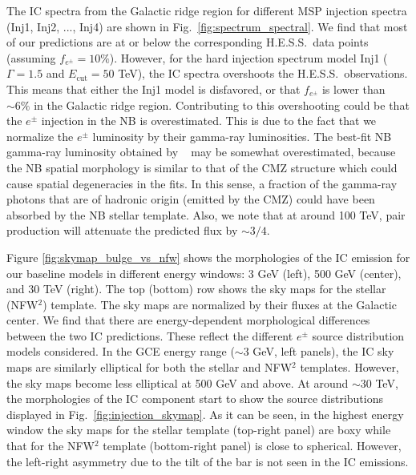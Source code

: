 \documentclass[doublespace,nopageskip]{VTthesis} %
\begin{document}
The IC spectra from the Galactic ridge region for different MSP injection spectra (Inj1, Inj2, ..., Inj4) are shown in Fig.~\ref{fig:spectrum_spectral}. We find that most of our predictions are at or below the corresponding H.E.S.S.~data points (assuming $f_{e^\pm} = 10\%$). However, for the hard injection spectrum model Inj1 ($\Gamma = 1.5$ and $E_{\text{cut}}=50$ TeV), the IC spectra overshoots the H.E.S.S.~observations. This means that either the Inj1 model is disfavored, or that $f_{e^\pm}$ is lower than $\sim 6\%$ in the Galactic ridge region. Contributing to this overshooting could be that the $e^\pm$ injection in the NB is overestimated. This is due to the fact that we normalize the $e^\pm$ luminosity by their gamma-ray luminosities. The best-fit NB gamma-ray luminosity obtained by ~\citet{2018NatAs...2..387M} may be somewhat overestimated, because the NB spatial morphology is similar to that of the CMZ structure which could cause spatial degeneracies in the fits. In this sense, a fraction of the gamma-ray photons that are of hadronic origin (emitted by the CMZ) could have been absorbed by the NB stellar template. Also, we note that at around 100 TeV, pair production will attenuate the predicted flux by $\sim 3/4$.

Figure \ref{fig:skymap_bulge_vs_nfw} shows the morphologies of the IC emission for our baseline models in different energy windows: 3 GeV (left), 500 GeV (center), and 30 TeV (right). The top (bottom) row shows the sky maps for the stellar (NFW$^2$) template. The sky maps are normalized by their fluxes at the Galactic center. We find that there are energy-dependent morphological differences between the two IC predictions. These reflect the different $e^\pm$ source distribution models considered. In the GCE energy range ($\sim 3$ GeV, left panels), the IC sky maps are similarly elliptical for both the stellar and NFW$^2$ templates. However, the sky maps become less elliptical at 500 GeV and above. At around $\sim 30$ TeV, the morphologies of the IC component start to show the source distributions displayed in Fig.~\ref{fig:injection_skymap}. As it can be seen, in the highest energy window the sky maps for the stellar template (top-right panel) are boxy while that for the NFW$^2$ template (bottom-right panel) is close to spherical. However, the left-right asymmetry due to the tilt of the bar is not seen in the IC emissions.
\end{document}
